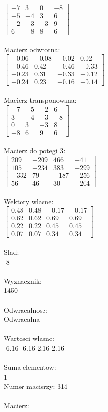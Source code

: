 \documentclass[a4paper,12pt]{article}
\begin{document}
$\begin{bmatrix} -7&3&0&-8\\-5&-4&3&6\\-2&-3&-3&9\\6&-8&8&6 \end{bmatrix}$
\\
\\
Macierz odwrotna:\\

$\begin{bmatrix} -0.06&-0.08&-0.02&0.02\\-0.46&0.42&-0.46&-0.33\\-0.23&0.31&-0.33&-0.12\\-0.24&0.23&-0.16&-0.14 \end{bmatrix}$
\\
\\
Macierz transponowana:\\

$\begin{bmatrix} -7&-5&-2&6\\3&-4&-3&-8\\0&3&-3&8\\-8&6&9&6 \end{bmatrix}$
\\
\\
Macierz do potegi 3:\\

$\begin{bmatrix} 209&-209&466&-41\\105&-234&383&-299\\-332&79&-187&-256\\56&46&30&-204 \end{bmatrix}$
\\
\\
Wektory wlasne:\\

$\begin{bmatrix} 0.48&0.48&-0.17&-0.17\\0.62&0.62&0.69&0.69\\0.22&0.22&0.45&0.45\\0.07&0.07&0.34&0.34 \end{bmatrix}$
\\
\\
Slad:\\
-8
\\
\\
Wyznacznik:\\
1450
\\
\\
Odwracalnosc:\\
Odwracalna
\\
\\
Wartosci wlasne:\\
-6.16 -6.16 2.16 2.16
\\
\\
Suma elementow:\\
1
\\
\newpage
Numer macierzy:
314
\\
\\
Macierz:\\
\end{document}
